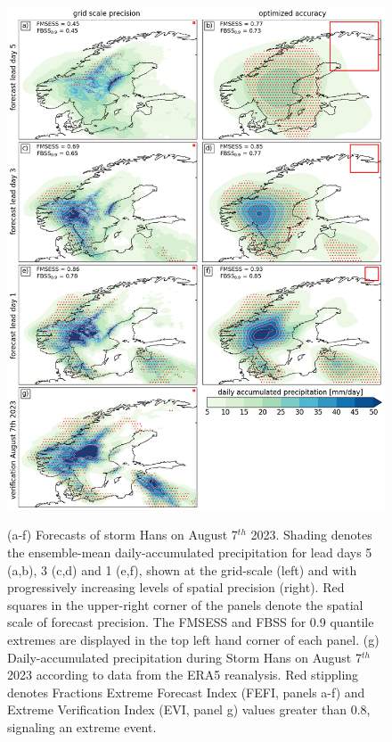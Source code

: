 \documentclass[preprint,12pt,authoryear]{elsarticle}
\begin{document}
\newpage
\begin{figure}[t]
  \noindent\includegraphics[scale=0.45]{fig_06.png}\\
  \caption{(a-f) Forecasts of storm Hans on August 7$^{th}$ 2023. Shading denotes the ensemble-mean daily-accumulated precipitation for lead days 5 (a,b), 3 (c,d) and 1 (e,f), shown at the grid-scale (left) and with progressively increasing levels of spatial precision (right). Red squares in the upper-right corner of the panels denote the spatial scale of forecast precision. The FMSESS and FBSS for 0.9 quantile extremes are displayed in the top left hand corner of each panel. (g) Daily-accumulated precipitation during Storm Hans on August 7$^{th}$ 2023 according to data from the ERA5 reanalysis. Red stippling denotes Fractions Extreme Forecast Index (FEFI, panels a-f) and Extreme Verification Index (EVI, panel g) values greater than 0.8, signaling an extreme event.} \label{f6}
\end{figure}
\end{document}
